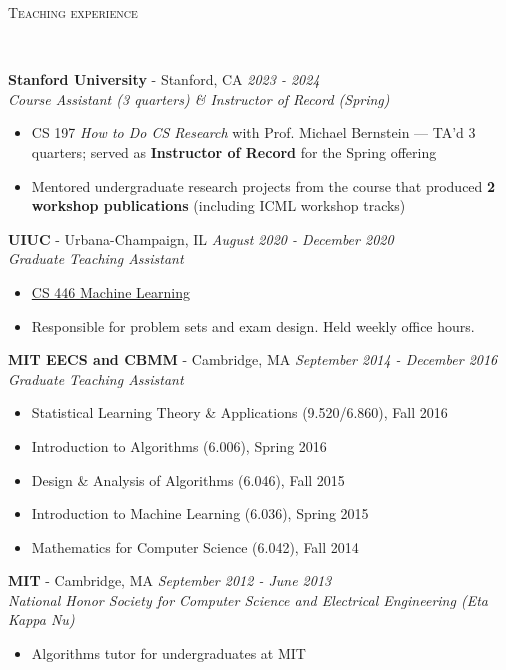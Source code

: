 \documentclass{article}
\newenvironment{changemargin}[2]{%
  \begin{list}{}{%
    \setlength{\topsep}{0pt}%
    \setlength{\leftmargin}{#1}%
    \setlength{\rightmargin}{#2}%
    \setlength{\listparindent}{\parindent}%
    \setlength{\itemindent}{\parindent}%
    \setlength{\parsep}{\parskip}%
  }%
  \item[]}{\end{list}
}
\newcommand{\lineover}{
	\begin{changemargin}{-0.05in}{-0.05in}
		\vspace*{-8pt}
		\hrulefill \\
		\vspace*{-2pt}
	\end{changemargin}
}
\newcommand{\header}[1]{
	\begin{changemargin}{-0.5in}{-0.5in}
		\scshape{#1}\\
  	\lineover
	\end{changemargin}
	\nopagebreak[4]    %
}
\newenvironment{body} {
		\vspace*{-16pt}
		\begin{changemargin}{-0.25in}{-0.5in}
	  }
		{\end{changemargin}\vspace{8pt plus 12pt}
	}
\begin{document}
\header{Teaching experience}
\begin{body}
	\vspace{12pt}

	\textbf{Stanford University} - Stanford, CA \hfill \emph{2023 - 2024}\\
	\emph{Course Assistant (3 quarters) \& Instructor of Record (Spring)}\\
	\vspace*{-3pt}
	\begin{itemize} \itemsep -2pt
		\item CS 197 \textit{How to Do CS Research} with Prof. Michael Bernstein --- TA'd 3 quarters; served as \textbf{Instructor of Record} for the Spring offering
		\item Mentored undergraduate research projects from the course that produced \textbf{2 workshop publications} (including ICML workshop tracks)
	\end{itemize}

	\textbf{UIUC} - Urbana-Champaign, IL \hfill \emph{August 2020 - December 2020}\\
	\emph{Graduate Teaching Assistant}\\
	\vspace*{-3pt}
	\begin{itemize} \itemsep -2pt
		\item \href{https://relate.cs.illinois.edu/course/CS446-fa20/}{CS 446 Machine Learning}
		\item Responsible for problem sets and exam design. Held weekly office hours.
	\end{itemize}
    
    \textbf{MIT EECS and CBMM} - Cambridge, MA \hfill \emph{September 2014 - December 2016}\\
	\emph{Graduate Teaching Assistant}\\
	\vspace*{-3pt}
	\begin{itemize} \itemsep -2pt
        \item Statistical Learning Theory \& Applications (9.520/6.860), Fall 2016
        \item Introduction to Algorithms (6.006), Spring 2016
        \item Design \& Analysis of Algorithms (6.046), Fall 2015
        \item Introduction to Machine Learning (6.036), Spring 2015
        \item Mathematics for Computer Science (6.042), Fall 2014
	\end{itemize}
    
    \textbf{MIT} - Cambridge, MA \hfill \emph{September 2012 - June 2013}\\
	\emph{National Honor Society for Computer Science and Electrical Engineering (Eta Kappa Nu)}\\
	\vspace*{-3pt}
	\begin{itemize} \itemsep -2pt
		\item Algorithms tutor for undergraduates at MIT
	\end{itemize}

\end{body}
\end{document}
